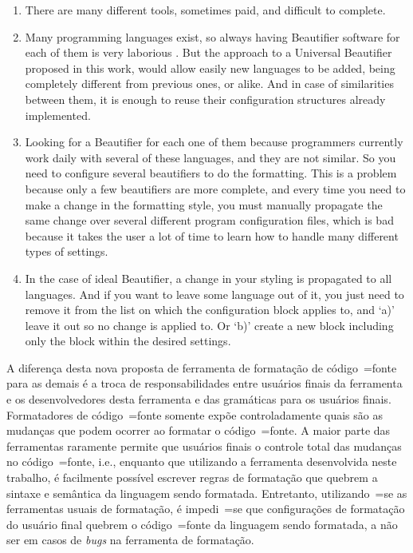 {\begin{enumerate}[leftmargin=*]
    \item
        There are many different tools, sometimes paid, and difficult to
        complete. \cite{universalCodeFormatter}
    \item
        Many programming languages exist, so always having Beautifier
        software for each of them is very laborious
        \cite{universalCodeFormatter}. But the approach to a Universal
        Beautifier proposed in this work, would allow easily new languages to be
        added, being completely different from previous ones, or alike. And in
        case of similarities between them, it is enough to reuse their
        configuration structures already implemented.
    \item
        Looking for a Beautifier for each one of them because programmers
        currently work daily with several of these languages, and they are not
        similar. So you need to configure several beautifiers to do the
        formatting. This is a problem because only a few beautifiers are more
        complete, and every time you need to make a change in the formatting
        style, you must manually propagate the same change over several
        different program configuration files, which is bad because it takes the
        user a lot of time to learn how to handle many different types of
        settings. \cite{universalIndentGUI}
    \item
        In the case of ideal Beautifier, a change in your styling is
        propagated to all languages. And if you want to leave some language out
        of it, you just need to remove it from the list on which the
        configuration block applies to, and `a)' leave it out so no change is
        applied to. Or `b)' create a new block including only the block within
        the desired settings.
\end{enumerate}
}{%
    A diferença desta nova proposta de ferramenta de formatação de código~=fonte para as demais é a troca de responsabilidades entre usuários finais da ferramenta e
    os desenvolvedores desta ferramenta e
    das gramáticas para os usuários finais.
    Formatadores de código~=fonte somente expõe controladamente quais são as mudanças que podem ocorrer ao formatar o código~=fonte.
    A maior parte das ferramentas raramente permite que usuários finais o controle total das mudanças no código~=fonte,
    i.e.,
    enquanto que utilizando a ferramenta desenvolvida neste trabalho,
    é facilmente possível escrever regras de formatação que quebrem a sintaxe e
    semântica da linguagem sendo formatada.
    Entretanto,
    utilizando~=se as ferramentas usuais de formatação,
    é impedi~=se que configurações de formatação do usuário final quebrem o código~=fonte da linguagem sendo formatada,
    a não ser em casos de \textit{bugs} na ferramenta de formatação.

}
